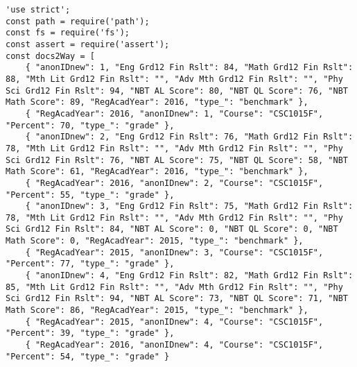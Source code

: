 \label{Map-List-tests}
\begin{verbatim}
'use strict';
const path = require('path');
const fs = require('fs');
const assert = require('assert');
const docs2Way = [
    { "anonIDnew": 1, "Eng Grd12 Fin Rslt": 84, "Math Grd12 Fin Rslt": 88, "Mth Lit Grd12 Fin Rslt": "", "Adv Mth Grd12 Fin Rslt": "", "Phy Sci Grd12 Fin Rslt": 94, "NBT AL Score": 80, "NBT QL Score": 76, "NBT Math Score": 89, "RegAcadYear": 2016, "type_": "benchmark" },
    { "RegAcadYear": 2016, "anonIDnew": 1, "Course": "CSC1015F", "Percent": 70, "type_": "grade" },
    { "anonIDnew": 2, "Eng Grd12 Fin Rslt": 76, "Math Grd12 Fin Rslt": 78, "Mth Lit Grd12 Fin Rslt": "", "Adv Mth Grd12 Fin Rslt": "", "Phy Sci Grd12 Fin Rslt": 76, "NBT AL Score": 75, "NBT QL Score": 58, "NBT Math Score": 61, "RegAcadYear": 2016, "type_": "benchmark" },
    { "RegAcadYear": 2016, "anonIDnew": 2, "Course": "CSC1015F", "Percent": 55, "type_": "grade" },
    { "anonIDnew": 3, "Eng Grd12 Fin Rslt": 75, "Math Grd12 Fin Rslt": 78, "Mth Lit Grd12 Fin Rslt": "", "Adv Mth Grd12 Fin Rslt": "", "Phy Sci Grd12 Fin Rslt": 84, "NBT AL Score": 0, "NBT QL Score": 0, "NBT Math Score": 0, "RegAcadYear": 2015, "type_": "benchmark" },
    { "RegAcadYear": 2015, "anonIDnew": 3, "Course": "CSC1015F", "Percent": 77, "type_": "grade" },
    { "anonIDnew": 4, "Eng Grd12 Fin Rslt": 82, "Math Grd12 Fin Rslt": 85, "Mth Lit Grd12 Fin Rslt": "", "Adv Mth Grd12 Fin Rslt": "", "Phy Sci Grd12 Fin Rslt": 94, "NBT AL Score": 73, "NBT QL Score": 71, "NBT Math Score": 86, "RegAcadYear": 2015, "type_": "benchmark" },
    { "RegAcadYear": 2015, "anonIDnew": 4, "Course": "CSC1015F", "Percent": 39, "type_": "grade" },
    { "RegAcadYear": 2016, "anonIDnew": 4, "Course": "CSC1015F", "Percent": 54, "type_": "grade" }


\end{verbatim}
